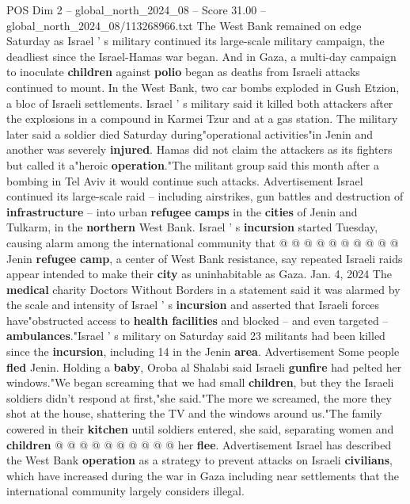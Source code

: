 \begin{textsample}{POS Dim 2 – global\_north\_2024\_08 – Score 31.00 – global\_north\_2024\_08/113268966.txt}  \label{ex:f2_pos_392}
The West Bank remained on edge Saturday as Israel ' s military continued its large-scale military campaign, the deadliest since the Israel-Hamas war began.
And in Gaza, a multi-day campaign to inoculate \textbf{children} against \textbf{polio} began as deaths from Israeli attacks continued to mount.
In the West Bank, two car bombs exploded in Gush Etzion, a bloc of Israeli settlements.
Israel ' s military said it killed both attackers after the explosions in a compound in Karmei Tzur and at a gas station.
The military later said a soldier died Saturday during"operational activities"in Jenin and another was severely \textbf{injured}.
Hamas did not claim the attackers as its fighters but called it a"heroic \textbf{operation}."The militant group said this month after a bombing in Tel Aviv it would continue such attacks.
Advertisement Israel continued its large-scale raid -- including airstrikes, gun battles and destruction of \textbf{infrastructure} -- into urban \textbf{refugee} \textbf{camps} in the \textbf{cities} of Jenin and Tulkarm, in the \textbf{northern} West Bank.
Israel ' s \textbf{incursion} started Tuesday, causing alarm among the international community that @ @ @ @ @ @ @ @ @ @ Jenin \textbf{refugee} \textbf{camp}, a center of West Bank resistance, say repeated Israeli raids appear intended to make their \textbf{city} as uninhabitable as Gaza.
Jan. 4, 2024 The \textbf{medical} charity Doctors Without Borders in a statement said it was alarmed by the scale and intensity of Israel ' s \textbf{incursion} and asserted that Israeli forces have"obstructed access to \textbf{health} \textbf{facilities} and blocked -- and even targeted -- \textbf{ambulances}."Israel ' s military on Saturday said 23 militants had been killed since the \textbf{incursion}, including 14 in the Jenin \textbf{area}.
Advertisement Some people \textbf{fled} Jenin.
Holding a \textbf{baby}, Oroba al Shalabi said Israeli \textbf{gunfire} had pelted her windows."We began screaming that we had small \textbf{children}, but they the Israeli soldiers didn't respond at first,"she said."The more we screamed, the more they shot at the house, shattering the TV and the windows around us."The family cowered in their \textbf{kitchen} until soldiers entered, she said, separating women and \textbf{children} @ @ @ @ @ @ @ @ @ @ her \textbf{flee}.
Advertisement Israel has described the West Bank \textbf{operation} as a strategy to prevent attacks on Israeli \textbf{civilians}, which have increased during the war in Gaza including near settlements that the international community largely considers illegal.

\end{textsample}
